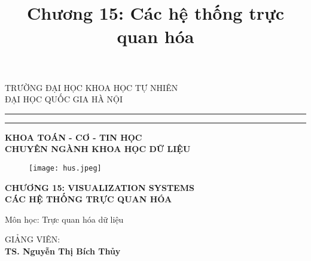 \documentclass[13pt]{scrartcl} %
\title{Chương 15: Các hệ thống trực quan hóa}
\begin{document}
\begin{titlepage}
    \begin{center}
        {{\Large{\textsc{TRƯỜNG ĐẠI HỌC KHOA HỌC TỰ NHIÊN \\ ĐẠI HỌC QUỐC GIA HÀ NỘI}}}} \rule[0.1cm]{15.8cm}{0.1mm}
        \rule[0.5cm]{15.8cm}{0.6mm}
        {\large{\bf KHOA TOÁN - CƠ - TIN HỌC \\ CHUYÊN NGÀNH KHOA HỌC DỮ LIỆU }}
    \end{center}


    \begin{figure}[!ht] %
        \centering
        \texttt{[image: hus.jpeg]}
    \end{figure}


    \begin{center}
        {\LARGE{\bf CHƯƠNG 15: VISUALIZATION SYSTEMS \\ CÁC HỆ THỐNG TRỰC QUAN HÓA}}
    \end{center}

    \vspace{5mm}


    \begin{center}
        \large{Môn học: Trực quan hóa dữ liệu}
    \end{center}

    \vspace{25mm}

    \hspace{0cm}\begin{minipage}[t]{0.7\textwidth}
        \normalsize{GIẢNG VIÊN:} \\
        \-\hspace{1cm}\large\textbf{TS. Nguyễn Thị Bích Thủy}
    \end{minipage}
    \par
    \vspace{5mm}


\end{titlepage}
\end{document}
